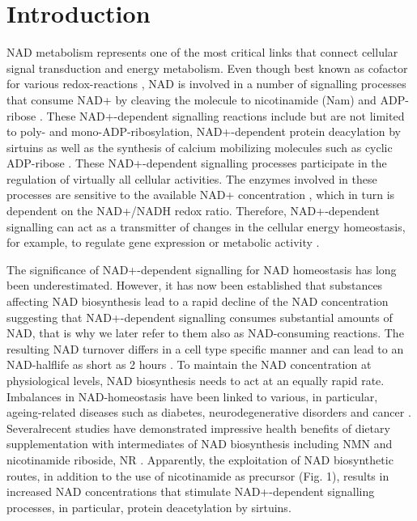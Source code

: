 
\section{Introduction}

NAD metabolism represents one of the most critical links that connect cellular signal transduction and energy metabolism.  Even though best known as cofactor for various redox-reactions , NAD is involved in a number of signalling processes that consume NAD+ by cleaving the molecule to nicotinamide (Nam) and ADP-ribose \cite{Verdin2015}. These NAD+-dependent signalling reactions include but are not limited to poly- and mono-ADP-ribosylation, NAD+-dependent protein deacylation by sirtuins as well as the synthesis of calcium mobilizing molecules such as cyclic ADP-ribose \cite{Opitz2015}. These NAD+-dependent signalling processes participate in the regulation of virtually all cellular activities. The enzymes involved in these processes are sensitive to the available NAD+ concentration \cite{Ruggieri2015}, which in turn is dependent on the NAD+/NADH redox ratio. Therefore, NAD+-dependent signalling can act as a transmitter of changes in the cellular energy homeostasis, for example, to regulate gene expression or metabolic activity \cite{Koch-Nolte2009}.

The significance of NAD+-dependent signalling for NAD homeostasis has long been underestimated. However, it has now been established that substances affecting NAD biosynthesis  lead to a rapid decline  of the NAD concentration \cite{Vacor2018} suggesting that NAD+-dependent signalling consumes substantial amounts of NAD, that is why we later refer to them also as NAD-consuming reactions. The resulting NAD turnover differs in a cell type specific manner and can lead to an NAD-halflife as short as 2 hours  \cite{Rabinowitz2018}\todo[author=Ines]. To maintain the NAD concentration at physiological levels, NAD biosynthesis needs to act at an equally rapid rate. Imbalances in NAD-homeostasis have been linked to various, in particular, ageing-related diseases such as diabetes, neurodegenerative disorders and cancer \cite{Chiarugi2012; Verdin2015}. Severalrecent studies have demonstrated impressive health benefits of dietary supplementation with intermediates of NAD biosynthesis including NMN and nicotinamide riboside, NR \cite{ImaiCellmetab2018}. Apparently, the exploitation of NAD biosynthetic routes, in addition to the use of nicotinamide as precursor (Fig. 1), results in increased NAD concentrations that stimulate NAD+-dependent signalling processes, in particular, protein deacetylation by sirtuins\cite{?}.

